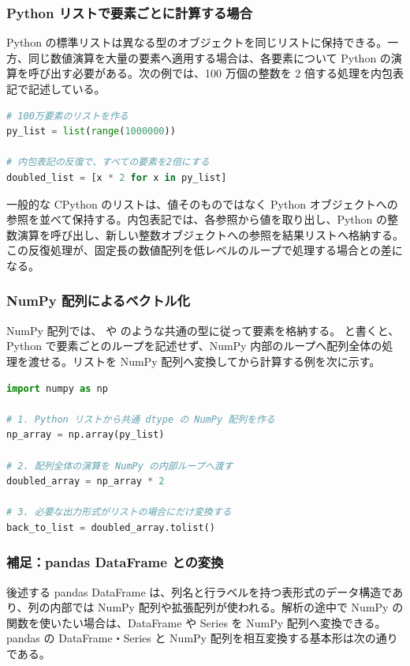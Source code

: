 \subsubsection{Python リストで要素ごとに計算する場合}

Python の標準リストは異なる型のオブジェクトを同じリストに保持できる。一方、同じ数値演算を大量の要素へ適用する場合は、各要素について Python の演算を呼び出す必要がある。次の例では、100 万個の整数を 2 倍する処理を内包表記で記述している。

\begin{lstlisting}[language=Python]
# 100万要素のリストを作る
py_list = list(range(1000000))

# 内包表記の反復で、すべての要素を2倍にする
doubled_list = [x * 2 for x in py_list]
\end{lstlisting}

一般的な CPython のリストは、値そのものではなく Python オブジェクトへの参照を並べて保持する。内包表記では、各参照から値を取り出し、Python の整数演算を呼び出し、新しい整数オブジェクトへの参照を結果リストへ格納する。この反復処理が、固定長の数値配列を低レベルのループで処理する場合との差になる。

\subsubsection{NumPy 配列によるベクトル化}

NumPy 配列では、 や  のような共通の型に従って要素を格納する。 と書くと、Python で要素ごとのループを記述せず、NumPy 内部のループへ配列全体の処理を渡せる。リストを NumPy 配列へ変換してから計算する例を次に示す。

\begin{lstlisting}[language=Python]
import numpy as np

# 1. Python リストから共通 dtype の NumPy 配列を作る
np_array = np.array(py_list)

# 2. 配列全体の演算を NumPy の内部ループへ渡す
doubled_array = np_array * 2

# 3. 必要な出力形式がリストの場合にだけ変換する
back_to_list = doubled_array.tolist()
\end{lstlisting}

\subsubsection{補足：pandas DataFrame との変換}

後述する pandas DataFrame は、列名と行ラベルを持つ表形式のデータ構造であり、列の内部では NumPy 配列や拡張配列が使われる。解析の途中で NumPy の関数を使いたい場合は、DataFrame や Series を NumPy 配列へ変換できる。pandas の DataFrame・Series と NumPy 配列を相互変換する基本形は次の通りである。

